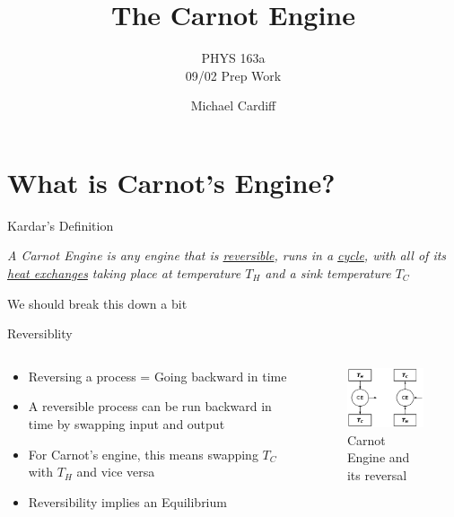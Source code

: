 \documentclass{beamer}
\title{The Carnot Engine}
\author{Michael Cardiff}
\subtitle{PHYS 163a \\ 09/02 Prep Work}
\begin{document}
\begin{frame}
  \titlepage
\end{frame}

\section{What is Carnot's Engine?}
\begin{frame}{Kardar's Definition}
  \begin{center}
    \textit{A Carnot Engine is any engine that is \underline{reversible}, runs in a \underline{cycle}, with all of its \underline{heat exchanges} taking place at temperature $T_H$ and a sink temperature $T_C$}
  \end{center}
  We should break this down a bit
\end{frame}

\begin{frame}{Reversiblity}
  \begin{columns}
    \begin{column}{0.5\textwidth}
      \begin{itemize}
      \item Reversing a process = Going backward in time
      \item A reversible process can be run backward in time by swapping input and output
      \item For Carnot's engine, this means swapping $T_C$ with $T_H$ and vice versa
      \item Reversibility implies an Equilibrium
      \end{itemize}
    \end{column}
    \begin{column}{0.5\textwidth}
      \begin{figure}[H]
        \centering
        \includegraphics[width=5.0cm]{carnot.png}
        \caption{Carnot Engine and its reversal}
      \end{figure}
    \end{column}
  \end{columns}
  
\end{frame}
\end{document}
